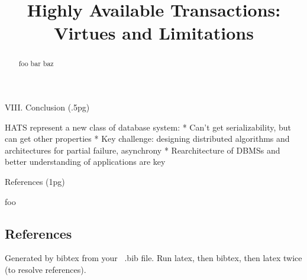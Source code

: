 \documentclass{vldb}
\begin{document}

\title{Highly Available Transactions: Virtues and Limitations}

\maketitle

\begin{abstract}
foo bar baz
\end{abstract}

















VIII. Conclusion (.5pg)

HATS represent a new class of database system:
* Can't get serializability, but can get other properties
* Key challenge: designing distributed algorithms and architectures for partial failure, asynchrony
* Rearchitecture of DBMSs and better understanding of applications are key

References (1pg)



foo~\cite{adya}


  

\subsection{References}

Generated by bibtex from your ~.bib file. Run latex, then bibtex, then
latex twice (to resolve references).


\begin{appendix}

\end{appendix}
\end{document}
